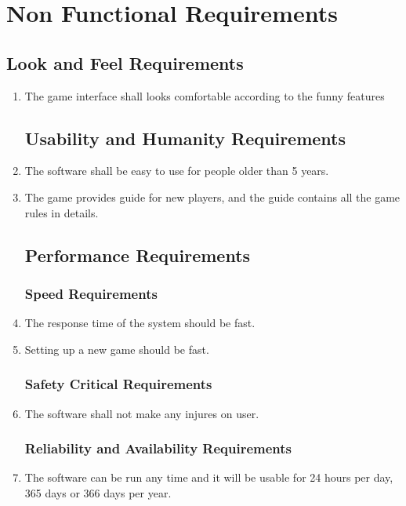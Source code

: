 \documentclass[10pt]{article}
\begin{document}
\section{Non Functional Requirements}
\subsection{Look and Feel Requirements}
\begin{enumerate}
\item The game interface shall looks comfortable according to the funny features

\subsection{Usability and Humanity Requirements}

\item The software shall be easy to use for people older than 5 years.
\item The game provides guide for new players, and the guide contains all the game rules in details.

\subsection{Performance Requirements}
\subsubsection{Speed Requirements}

\item The response time of the system should be fast.
\item Setting up a new game should be fast.

\subsubsection{Safety Critical Requirements}

\item The software shall not make any injures on user.

\subsubsection{Reliability and Availability Requirements}

\item The software can be run any time and it will be usable for 24 hours per day, 365 days or 366 days per year.


\end{enumerate}
\end{document}
